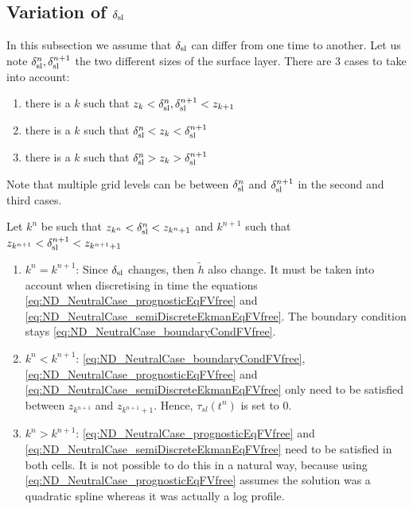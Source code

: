 \subsection{Variation of $\delta_{\rm sl}$}
In this subsection we assume that $\delta_{\rm sl}$ can differ
from one time to another. Let us note
$\delta_{\rm sl}^n, \delta_{\rm sl}^{n+1}$ the two different sizes
of the surface layer.
There are 3 cases to take into account:
\begin{enumerate}
\item there is a $k$ such that
	$z_k< \delta_{\rm sl}^n, \delta_{\rm sl}^{n+1} < z_{k+1}$
\item there is a $k$ such that
	$ \delta_{\rm sl}^n < z_k < \delta_{\rm sl}^{n+1}$
\item there is a $k$ such that
	$ \delta_{\rm sl}^n > z_k > \delta_{\rm sl}^{n+1}$
\end{enumerate}
Note that multiple grid levels can be between $\delta_{\rm sl}^{n}$
and $\delta_{\rm sl}^{n+1}$ in the second and third cases.
\par
Let $k^n$ be such that $z_{k^n} < \delta_{\rm sl}^{n}< z_{k^n + 1}$
and $k^{n+1}$ such that
$z_{k^{n+1}} < \delta_{\rm sl}^{n+1}< z_{k^{n+1} + 1}$
\begin{enumerate}
	\item $k^n = k^{n+1}$:
Since $\delta_{\rm sl}$ changes, then $\widetilde{h}$ also change.
It must be taken into account when
discretising in time the equations
\eqref{eq:ND_NeutralCase_prognosticEqFVfree} and 
\eqref{eq:ND_NeutralCase_semiDiscreteEkmanEqFVfree}.
The boundary condition stays \eqref{eq:ND_NeutralCase_boundaryCondFVfree}.
	\item $k^n < k^{n+1}$:
\eqref{eq:ND_NeutralCase_boundaryCondFVfree},
\eqref{eq:ND_NeutralCase_prognosticEqFVfree} and 
\eqref{eq:ND_NeutralCase_semiDiscreteEkmanEqFVfree} only need to
be satisfied between $z_{k^{n+1}}$ and $z_{k^{n+1}+1}$.
Hence, $\tau_{sl}(t^n)$ is set to 0.
	\item $k^n > k^{n+1}$:
\eqref{eq:ND_NeutralCase_prognosticEqFVfree} and 
\eqref{eq:ND_NeutralCase_semiDiscreteEkmanEqFVfree}
need to be satisfied in both cells.
{\color{red} It is not possible to do this in a natural way,
because using \eqref{eq:ND_NeutralCase_prognosticEqFVfree}
assumes the solution was a quadratic spline whereas it was actually
a log profile.
}
\end{enumerate}
